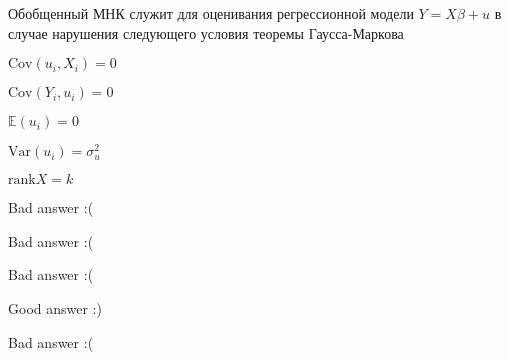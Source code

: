 
\begin{question}
Обобщенный МНК служит для оценивания регрессионной модели \(Y=X\beta + u\) в случае нарушения следующего условия теоремы Гаусса-Маркова
\begin{answerlist}
  \item \(\mathrm{Cov}(u_i, X_i)=0\)
  \item \(\mathrm{Cov}(Y_i, u_i)=0\)
  \item \(\mathbb{E}(u_i)=0\)
  \item \(\mathrm{Var}(u_i)=\sigma^2_u\)
  \item \(\mathrm{rank} X = k\)
\end{answerlist}
\end{question}

\begin{solution}
\begin{answerlist}
  \item Bad answer :(
  \item Bad answer :(
  \item Bad answer :(
  \item Good answer :)
  \item Bad answer :(
\end{answerlist}
\end{solution}

